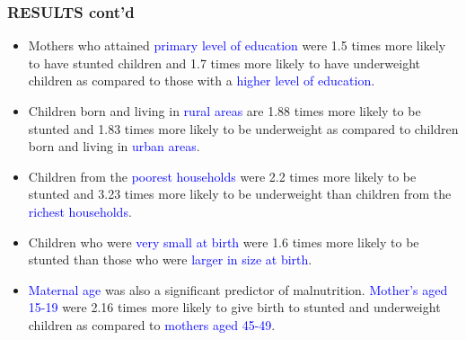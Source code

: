 	\begin{frame}
		\frametitle {RESULTS cont'd}
		\begin{itemize}
			\item Mothers who attained \textcolor {blue}{primary level of education} were \alert{1.5 times more likely} to have stunted children and \alert{1.7 times more  likely} to have underweight children as compared to those with a \textcolor {blue}{higher level of education}. 
			\item Children born and living in \textcolor {blue}{rural areas} are \alert{1.88 times more likely} to be stunted and \alert{1.83 times more likely} to be underweight as compared to children born and living in \textcolor {blue}{urban areas}. 
			\item Children from the \textcolor {blue}{poorest households} were \alert{2.2 times more likely} to be stunted and \alert{3.23 times more likely} to be underweight than children from the \textcolor {blue} {richest households}. 
			\item Children who were \textcolor {blue}{very small at birth} were \alert{1.6 times more likely} to be stunted than those who were \textcolor {blue}{larger in size  at birth}.
			\item \textcolor {blue}{Maternal age} was also a significant predictor of malnutrition. \textcolor {blue} {Mother’s aged 15-19} were \alert{2.16 times more likely} to give birth to stunted  and underweight children  as compared to \textcolor {blue}{mothers aged 45-49}. 
		\end{itemize}
	\end{frame}
